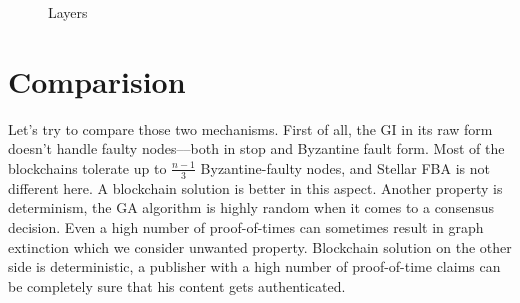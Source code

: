 \documentclass[nostrict]{szablonPG}
\begin{document}
\begin{figure}[h!]
 \hfill
\caption{Layers}
\label{fig:layers}
\end{figure}

\section{Comparision}
Let's try to compare those two mechanisms. First of all, the GI in its raw form doesn't handle faulty nodes––both in stop and Byzantine fault form. Most of the blockchains tolerate up to $\frac{n-1}{3}$ Byzantine-faulty nodes, and Stellar FBA is not different here. A blockchain solution is better in this aspect.
Another property is determinism, the GA algorithm is highly random when it comes to a consensus decision. Even a high number of proof-of-times can sometimes result in graph extinction which we consider unwanted property. Blockchain solution on the other side is deterministic, a publisher with a high number of proof-of-time claims can be completely sure that his content gets authenticated. 
\end{document}
